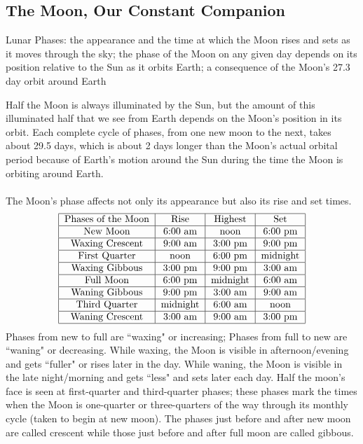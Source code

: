 \documentclass[12pt]{article}
\begin{document}
\subsection{The Moon, Our Constant Companion} 
\begin{definition} Lunar Phases: the appearance and the time at which the Moon rises and sets as it moves through the sky; the phase of the Moon on any given day depends on its position relative to the Sun as it orbits Earth; a consequence of the Moon's 27.3 day orbit around Earth \end{definition} 
Half the Moon is always illuminated by the Sun, but the amount of this illuminated half that we see from Earth depends on the Moon's position in its orbit. Each complete cycle of phases, from one new moon to the next, takes about 29.5 days, which is about 2 days longer than the Moon's actual orbital period because of Earth's motion around the Sun during the time the Moon is orbiting around Earth. \\~\\ 
The Moon's phase affects not only its appearance but also its rise and set times. 
$$ \begin{tabular}{|c|c|c|c|} \hline
Phases of the Moon & Rise & Highest & Set \\ \hline 
New Moon & 6:00 am & noon & 6:00 pm \\ \hline
Waxing Crescent & 9:00 am & 3:00 pm & 9:00 pm \\ \hline
First Quarter & noon & 6:00 pm & midnight \\ \hline
Waxing Gibbous & 3:00 pm & 9:00 pm & 3:00 am \\ \hline
Full Moon & 6:00 pm & midnight & 6:00 am \\ \hline 
Waning Gibbous & 9:00 pm & 3:00 am & 9:00 am \\ \hline 
Third Quarter & midnight & 6:00 am & noon \\ \hline 
Waning Crescent & 3:00 am & 9:00 am & 3:00 pm \\ \hline \end{tabular} $$
Phases from new to full are ``waxing" or increasing; Phases from full to new are ``waning" or decreasing. While waxing, the Moon is visible in afternoon/evening and gets ``fuller" or rises later in the day. While waning, the Moon is visible in the late night/morning and gets ``less" and sets later each day. Half the moon's face is seen at first-quarter and third-quarter phases; these phases mark the times when the Moon is one-quarter or three-quarters of the way through its monthly cycle (taken to begin at new moon). The phases just before and after new moon are called crescent while those just before and after full moon are called gibbous. 
\end{document}
